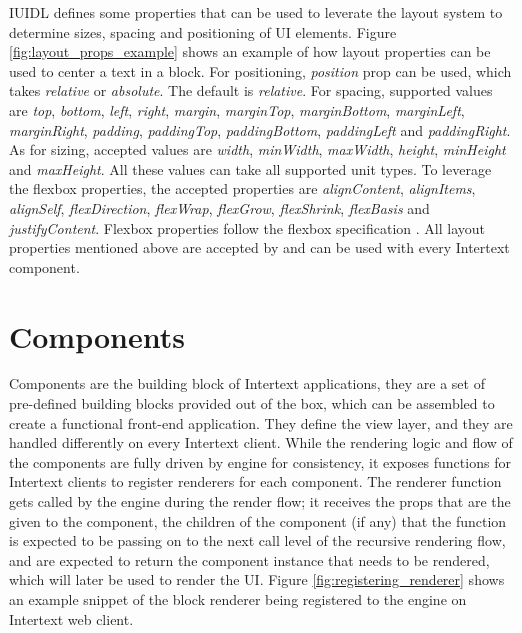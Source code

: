 IUIDL defines some properties that can be used to leverate the layout system to determine sizes, spacing and positioning of UI elements. Figure \ref{fig:layout_props_example} shows an example of how layout properties can be used to center a text in a block. For positioning, \textit{position} prop can be used, which takes \textit{relative} or \textit{absolute}. The default is \textit{relative}. For spacing, supported values are \textit{top}, \textit{bottom}, \textit{left}, \textit{right}, \textit{margin}, \textit{marginTop}, \textit{marginBottom}, \textit{marginLeft}, \textit{marginRight}, \textit{padding}, \textit{paddingTop}, \textit{paddingBottom}, \textit{paddingLeft} and \textit{paddingRight}. As for sizing, accepted values are \textit{width}, \textit{minWidth}, \textit{maxWidth}, \textit{height}, \textit{minHeight} and \textit{maxHeight}. All these values can take all supported unit types. To leverage the flexbox properties, the accepted properties are \textit{alignContent}, \textit{alignItems}, \textit{alignSelf}, \textit{flexDirection}, \textit{flexWrap}, \textit{flexGrow}, \textit{flexShrink}, \textit{flexBasis} and \textit{justifyContent}. Flexbox properties follow the flexbox specification \cite{FlexSpec1} \cite{FlexSpec2}. All layout properties mentioned above are accepted by and can be used with every Intertext component.

\section{Components}

Components are the building block of Intertext applications, they are a set of pre-defined building blocks provided out of the box, which can be assembled to create a functional front-end application. They define the view layer, and they are handled differently on every Intertext client. While the rendering logic and flow of the components are fully driven by engine for consistency, it exposes functions for Intertext clients to register renderers for each component. The renderer function gets called by the engine during the render flow; it receives the props that are the given to the component, the children of the component (if any) that the function is expected to be passing on to the next call level of the recursive rendering flow, and are expected to return the component instance that needs to be rendered, which will later be used to render the UI. Figure \ref{fig:registering_renderer} shows an example snippet of the block renderer being registered to the engine on Intertext web client.

